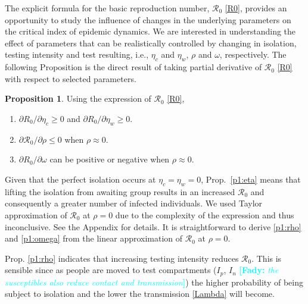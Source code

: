 \documentclass[12pt]{article}
\newcommand{\comment}{\showcomment}
\newcommand{\showcomment}[3]{\textcolor{#1}{\textbf{[#2: }\textsl{#3}\textbf{]}}}
\newcommand{\fady}[1]{\comment{cyan}{Fady}{#1}}
\newcommand{\Rnum}{\mathcal{R}_0}
\theoremstyle{definition} %
\newtheorem{proposition}{Proposition}
\begin{document}
The explicit formula for the basic reproduction number, $\Rnum$ \eqref{R0}, provides an opportunity to study the influence of changes in the underlying parameters on the critical index of epidemic dynamics. We are interested in understanding the effect of parameters that can be realistically controlled by changing in isolation, testing intensity and test resulting, i.e., $\eta_c$ and $\eta_w$, $\rho$ and $\omega$, respectively. The following Proposition is the direct result of taking partial derivative of $\Rnum$ \eqref{R0} with respect to selected parameters. 

\begin{proposition}
\label{prop1}
Using the expression of $\Rnum$ \eqref{R0},
\begin{enumerate}
\item \label{p1:eta}
$\partial{R_0}/\partial{\eta_c} \geq 0$ and $\partial{R_0}/\partial{\eta_w} \geq 0$. 
\item \label{p1:rho}
$\partial{\Rnum}/\partial{\rho} \leq 0$ when $\rho \approx 0$.
\item \label{p1:omega}
$\partial{R_0}/\partial{\omega}$ can be positive or negative when $\rho \approx 0$.
\end{enumerate}
\end{proposition}

 Given that the perfect isolation occurs at $\eta_c=\eta_w = 0$, Prop.~\ref{p1:eta} means that lifting the isolation from awaiting group results in an increased $\Rnum$ and consequently a greater number of infected individuals. We used Taylor approximation of $\Rnum$ at $\rho=0$ due to the complexity of the expression and thus inconclusive. See the Appendix for details. It is straightforward to derive \ref{p1:rho} and \ref{p1:omega} from the linear approximation of $\Rnum$ at $\rho=0$.
 
 Prop. \ref{p1:rho} indicates that increasing testing intensity reduces $\Rnum$. This is sensible since as people are moved to test compartments ($I_p$, $I_n$ \fady{the susceptibles also reduce contact and transmission}) the higher probability of being subject to isolation and the lower the transmission \eqref{Lambda} will become.
\end{document}
